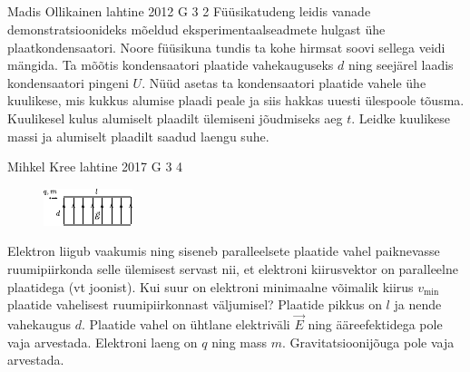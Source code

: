 \documentclass[11pt, twoside]{article}
\begin{document}
{{\begin{figure}[h]
\begin{center}
\end{center}
\end{figure}
\fi
}
\newpage\subsection{\protect{}}

{Madis Ollikainen} %
{lahtine} %
{2012} %
{G 3} %
{2} %
{
\ifStatement
Füüsikatudeng leidis vanade demonstratsioonideks mõeldud eksperimentaalseadmete
hulgast ühe plaatkondensaatori. Noore füüsikuna tundis ta kohe hirmsat soovi
sellega veidi mängida. Ta mõõtis kondensaatori plaatide vahekauguseks $d$
ning seejärel laadis kondensaatori pingeni $U$. Nüüd asetas ta
kondensaatori plaatide vahele ühe kuulikese, mis kukkus alumise plaadi peale
ja siis hakkas uuesti ülespoole tõusma. Kuulikesel kulus alumiselt plaadilt
ülemiseni jõudmiseks aeg $t$. Leidke kuulikese massi ja alumiselt plaadilt
saadud laengu suhe.
\fi
}

{Mihkel Kree} %
{lahtine} %
{2017} %
{G 3} %
{4} %
{
\ifStatement
\begin{figure}
	\vspace{-10pt}
	\hspace{-10pt}
	\includegraphics[width=\linewidth]{2017-lahg-03-elJoonisMK.pdf}
\end{figure}

Elektron liigub vaakumis ning siseneb paralleelsete plaatide vahel paiknevasse ruumipiirkonda selle ülemisest servast nii, et elektroni kiirusvektor on paralleelne plaatidega (vt joonist). Kui suur on elektroni minimaalne võimalik kiirus $v_\mathrm{min}$ plaatide vahelisest ruumipiirkonnast väljumisel? Plaatide pikkus on $l$ ja nende vahekaugus $d$. Plaatide vahel on ühtlane elektriväli $\vec{E}$ ning ääreefektidega pole vaja arvestada. Elektroni laeng on $q$ ning mass $m$. Gravitatsioonijõuga pole vaja arvestada.
\fi
}

}
\end{document}
